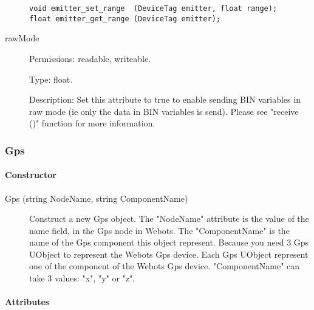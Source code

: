 \begin{description}
\begin{lstlisting}[firstnumber=1,]
void emitter_set_range  (DeviceTag emitter, float range);
float emitter_get_range (DeviceTag emitter);
\end{lstlisting}
\item[{         rawMode
 }]            Permissions: readable, writeable.


 Type: float.


 Description: Set this attribute to true to enable sending BIN
 variables in raw mode (ie only the data in BIN variables is
 send). Please see "receive ()" function for more information.

\end{description}

\subsubsection{Gps}
\label{webots.uobjects.robotdevices.gps}%

\paragraph{Constructor}
\label{webots.uobjects.robotdevices.gps.constructor}%

\noindent
\begin{description}
\item[{Gps (string NodeName, string ComponentName)}] Construct a new
  Gps object.  The "NodeName" attribute is the value of the name
  field, in the Gps node in Webots.  The "ComponentName" is the name
  of the Gps component this object represent.  Because you need 3 Gps
  UObject to represent the Webots Gps device. Each Gps UObject
  represent one of the component of the Webots Gps device.
  "ComponentName" can take 3 values: "x", "y" or "z".

\end{description}

\paragraph{Attributes}
\label{webots.uobjects.robotdevices.gps.attributes}%

